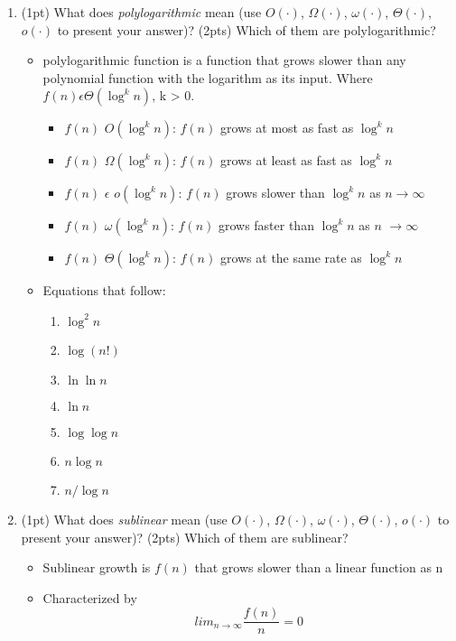 \documentclass{article}[12pt]
\newcommand\encircle[1]{\raisebox{.5pt}{\textcircled{\raisebox{-.9pt} {\footnotesize #1}}} }
\begin{document}
\begin{enumerate}[label=(\arabic*)]
  \item (1pt) What does \emph{polylogarithmic} mean (use $O(\cdot)$, $\Omega(\cdot)$, $\omega(\cdot)$, $\Theta(\cdot)$, $o(\cdot)$ to present your answer)? (2pts) Which of them are polylogarithmic?
    \begin{itemize}
      \item polylogarithmic function is a function that grows 
        slower than any polynomial function with the logarithm as its input.
        Where $f(n) \epsilon \Theta(\log^k n)$, k > 0.
        \begin{itemize}
          \item $f(n)$ \epsilon $O(\log^k n)$: $f(n)$ grows at most as fast as $\log^k n$
          \item $f(n)$ \epsilon $\Omega(\log^k n)$: $f(n)$ grows at least as fast as $\log^k n$
          \item $f(n)$ $\epsilon$  $o(\log^k n)$: $f(n)$ grows slower than $\log^k n$ as $n \rightarrow \infty$
          \item $f(n)$ \epsilon $\omega(\log^k n)$: $f(n)$ grows faster than $\log^k n$ as $n$ $\rightarrow \infty$
          \item $f(n)$ \epsilon $\Theta(\log^k n)$: $f(n)$ grows at the same rate as $\log^k n$
        \end{itemize}
      \item Equations that follow:
\begin{center}
\begin{multicols}{4}
\begin{enumerate}[label=\encircle{\arabic*}]
  \item $\log^2n$
  \item $\log(n!)$
  \item $\ln\ln n$
  \item $\ln n$
  \item $\log \log n$
  \item $n\log n$
  \item $n/\log n$
\end{enumerate}
\end{multicols}
\end{center}

    \end{itemize}

\pagebreak

  \item (1pt) What does \emph{sublinear} mean (use $O(\cdot)$, $\Omega(\cdot)$, $\omega(\cdot)$, $\Theta(\cdot)$, $o(\cdot)$ to present your answer)? (2pts) Which of them are sublinear?
    \begin{itemize}
      \item Sublinear growth is $f(n)$ that grows slower than a linear function as n \rightarrow \infty
      \item Characterized by 
        \begin{equation}
          lim_{n \rightarrow \infty} \frac{f(n)}{n} = 0
        \end{equation}


\end{itemize}
\end{enumerate}
\end{document}

